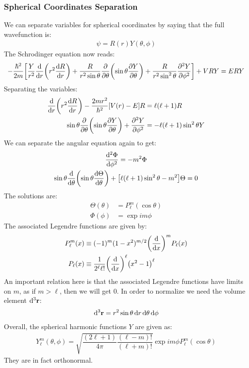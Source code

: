 \subsubsection{Spherical Coordinates Separation}
We can separate variables for spherical coordinates by saying that the full wavefunction is:
\begin{align*}
  \psi=R(r)Y(\theta,\phi)
\end{align*}
The Schrodinger equation now reads:
\begin{align*}
  -\dfrac{\hbar^2}{2m}\qty[\dfrac{Y}{r^2}\dv{r}\qty(r^2\dv{R}{r})
    +\dfrac{R}{r^2\sin\theta}\pdv{\theta}\qty(\sin\theta\pdv{Y}{\theta})
    +\dfrac{R}{r^2\sin^2\theta}\pdv[2]{Y}{\phi}
  ]+VRY=ERY
\end{align*}
Separating the variables:
\begin{align*}
  \dv{r}\qty(r^2\dv{R}{r})-\dfrac{2mr^2}{\hbar^2}\qty[V(r)-E]R&=\ell(\ell+1)R\\
  \sin\theta\pdv{\theta}\qty(\sin\theta\pdv{Y}{\theta})+\pdv[2]{Y}{\phi}&=
  -\ell(\ell+1)\sin^2\theta Y
\end{align*}
We can separate the angular equation again to get:
\begin{gather*}
  \dv[2]{\Phi}{\phi}=-m^2\Phi\\
  \sin\theta\dv{\theta}\qty(\sin\theta\dv{\Theta}{\theta})+
  \qty[\ell(\ell+1)\sin^2\theta-m^2]\Theta=0
\end{gather*}
The solutions are:
\begin{align*}
  \Theta(\theta)&=P_\ell^m(\cos\theta)\\
  \Phi(\phi)&=\exp{im\phi}
\end{align*}
The associated Legendre functions are given by:
\begin{align*}
  P_\ell^m(x)&\equiv(-1)^m(1-x^2)^{m/2}\qty(\dv{x})^mP_\ell(x)\\
  P_\ell(x)&\equiv\dfrac{1}{2^\ell\ell!}\qty(\dv{x})^\ell\qty(x^2-1)^\ell
\end{align*}
An important relation here is that the associated Legendre functions have limits on $m$, as if $m>\ell$, then we will get $0$. In order to normalize we need the volume element $\dd[3]{\vb{r}}$:
\begin{align*}
  \dd[3]{\vb{r}}=r^2\sin\theta\dd{r}\dd{\theta}\dd{\phi}
\end{align*}
Overall, the spherical harmonic functions $Y$ are given as:
\begin{align*}
  Y_\ell^m(\theta,\phi)=\sqrt{\dfrac{(2\ell+1)}{4\pi}\dfrac{(\ell-m)!}{(\ell+m)!}}
  \exp{im\phi}P_\ell^m(\cos\theta)
\end{align*}
They are in fact orthonormal.
